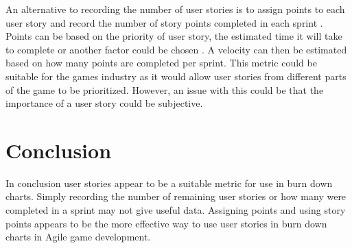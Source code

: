 \documentclass{scrartcl}
\begin{document}
An alternative to recording the number of user stories is to assign points to each user story and record the number of story points completed in each sprint \cite{Downey}. Points can be based on the priority of user story, the estimated time it will take to complete or another factor could be chosen \cite{Downey}. A velocity can then be estimated based on how many points are completed per sprint.  This metric could be suitable for the games industry as it would allow user stories from different parts of the game to be prioritized.  However, an issue with this could be that the importance of a user story could be subjective. 


\section{Conclusion}
In conclusion user stories appear to be a suitable metric for use in burn down charts. Simply recording the number of remaining user stories or how many were completed in a sprint may not give useful data. Assigning points and using story points appears to be the more effective way to use user stories in burn down charts in Agile game development. 

	


	
\end{document}
